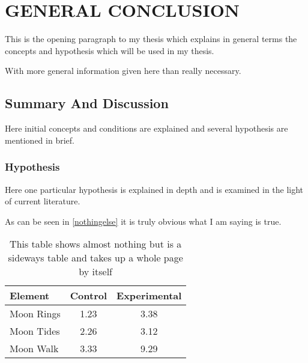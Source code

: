 \chapter{GENERAL CONCLUSION}
\label{future-work}


This is the opening paragraph to my thesis which
explains in general terms the concepts and hypothesis
which will be used in my thesis.

With more general information given here than really
necessary.

\section{Summary And Discussion}

Here initial concepts and conditions are explained and
several hypothesis are mentioned in brief.


\subsection{Hypothesis}

Here one particular hypothesis is explained in depth
and is examined in the light of current literature.

As can be seen in \autoref{nothingelse} it is
truly obvious what I am saying is true.
\begin{landscape}
\hfill
\vfill
\begin{table}[h!] \centering
\caption{This table shows almost nothing but is a
sideways table and takes up a whole page by itself}
\label{nothingelse}
\begin{tabular}{lcc} \hline
\textbf{Element} & \textbf{Control} & \textbf{Experimental} \\ \hline
Moon Rings & 1.23 & 3.38 \\
Moon Tides & 2.26 & 3.12 \\
Moon Walk & 3.33 & 9.29 \\ \hline
\end{tabular}
\end{table}
\hfill
\vfill
\end{landscape}

